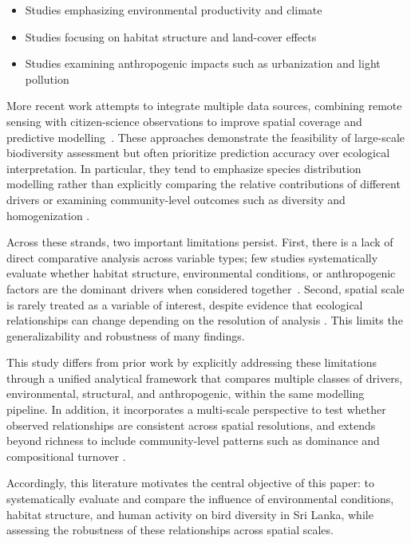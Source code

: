 \documentclass[conference]{IEEEtran}
\begin{document}
\begin{itemize}
    \item Studies emphasizing environmental productivity and climate \cite{ref4,ref7,ref1}
    \item Studies focusing on habitat structure and land-cover effects \cite{ref8,ref10,ref16}
    \item Studies examining anthropogenic impacts such as urbanization and light pollution \cite{ref12,ref13,ref15}
\end{itemize}

More recent work attempts to integrate multiple data sources, combining remote sensing with citizen-science observations to improve spatial coverage and predictive modelling~\cite{ref5}. These approaches demonstrate the feasibility of large-scale biodiversity assessment but often prioritize prediction accuracy over ecological interpretation. In particular, they tend to emphasize species distribution modelling rather than explicitly comparing the relative contributions of different drivers or examining community-level outcomes such as diversity and homogenization \cite{ref6}.

Across these strands, two important limitations persist. First, there is a lack of direct comparative analysis across variable types; few studies systematically evaluate whether habitat structure, environmental conditions, or anthropogenic factors are the dominant drivers when considered together~\cite{ref2}. Second, spatial scale is rarely treated as a variable of interest, despite evidence that ecological relationships can change depending on the resolution of analysis \cite{ref4}. This limits the generalizability and robustness of many findings. 

This study differs from prior work by explicitly addressing these limitations through a unified analytical framework that compares multiple classes of drivers, environmental, structural, and anthropogenic, within the same modelling pipeline. In addition, it incorporates a multi-scale perspective to test whether observed relationships are consistent across spatial resolutions, and extends beyond richness to include community-level patterns such as dominance and compositional turnover \cite{ref14,ref16}. 

Accordingly, this literature motivates the central objective of this paper: to systematically evaluate and compare the influence of environmental conditions, habitat structure, and human activity on bird diversity in Sri Lanka, while assessing the robustness of these relationships across spatial scales.
\end{document}
